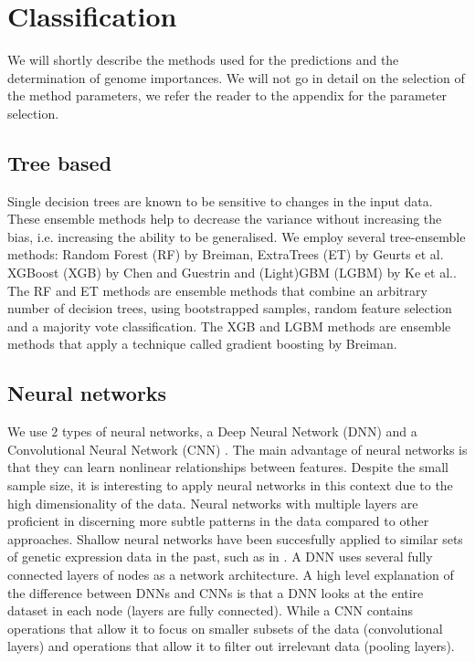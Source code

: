 \documentclass[a4paper,10pt]{article}
\begin{document}
\section{Classification}
%
We will shortly describe the methods used for the predictions and the determination of genome importances.
We will not go in detail on the selection of the method parameters, we refer the reader to the appendix for the
parameter selection.

\subsection{Tree based}

Single decision trees are known to be sensitive to changes in the input data. These ensemble methods 
help to decrease the variance without increasing the bias, i.e. increasing the ability to be generalised.
We employ several tree-ensemble methods: Random Forest (RF) by Breiman\cite{Breiman2001}, ExtraTrees (ET) by Geurts et al.\cite{Geurts2006} 
XGBoost (XGB) by Chen and Guestrin\cite{Chen2016} and (Light)GBM (LGBM) by Ke et al.\cite{Ke2017}.
The RF and ET methods are ensemble methods that combine an arbitrary number of decision trees, using bootstrapped samples,
random feature selection and a majority vote classification. The XGB and LGBM methods are ensemble methods 
that apply a technique called gradient boosting by Breiman\cite{Breiman1997}.
%
\subsection{Neural networks}
%
We use $2$ types of neural networks, a Deep Neural Network (DNN) \cite{lecun2015deep} and a Convolutional Neural Network (CNN) \cite{Lecun98}. The main advantage of neural networks is that they can learn nonlinear relationships between features. Despite the small sample size, it is interesting to apply neural networks in this context due to the high dimensionality of the data. Neural networks with multiple layers are proficient in discerning more subtle patterns in the data compared to other approaches. Shallow neural networks have been succesfully applied to similar sets of genetic expression data in the past, such as in \cite{khan2001classification}.
A DNN uses several fully connected layers of nodes as a network architecture. A high level explanation of the difference between DNNs and CNNs is that a DNN looks at the entire dataset in each node (layers are fully connected).
While a CNN contains operations that allow it to focus on smaller subsets of the data (convolutional layers) 
and operations that allow it to filter out irrelevant data (pooling layers). 
\end{document}
